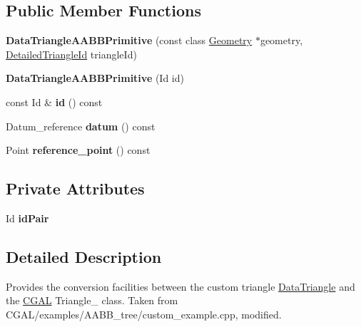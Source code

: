 \subsection*{Public Member Functions}
\begin{DoxyCompactItemize}
\item 
\mbox{\label{structpepr3d_1_1_data_triangle_a_a_b_b_primitive_ac15769289a1f00edca2755ef957c32ce}} 
{\bfseries Data\+Triangle\+A\+A\+B\+B\+Primitive} (const class \mbox{\hyperlink{classpepr3d_1_1_geometry}{Geometry}} $\ast$geometry, \mbox{\hyperlink{structpepr3d_1_1_detailed_triangle_id}{Detailed\+Triangle\+Id}} triangle\+Id)
\item 
\mbox{\label{structpepr3d_1_1_data_triangle_a_a_b_b_primitive_a1859d36669fbe329932f428f3ecee85f}} 
{\bfseries Data\+Triangle\+A\+A\+B\+B\+Primitive} (Id id)
\item 
\mbox{\label{structpepr3d_1_1_data_triangle_a_a_b_b_primitive_a8a808ea38f341eea53d9ee7b8ec75a5e}} 
const Id \& {\bfseries id} () const
\item 
\mbox{\label{structpepr3d_1_1_data_triangle_a_a_b_b_primitive_adc3319330dc4c5cbaa4c5fa04e6da337}} 
Datum\+\_\+reference {\bfseries datum} () const
\item 
\mbox{\label{structpepr3d_1_1_data_triangle_a_a_b_b_primitive_a2ea734c391b726dd56db7c8933f7dd0e}} 
Point {\bfseries reference\+\_\+point} () const
\end{DoxyCompactItemize}
\subsection*{Private Attributes}
\begin{DoxyCompactItemize}
\item 
\mbox{\label{structpepr3d_1_1_data_triangle_a_a_b_b_primitive_a6de025ee40eb24d625f08d227e575aa7}} 
Id {\bfseries id\+Pair}
\end{DoxyCompactItemize}


\subsection{Detailed Description}
Provides the conversion facilities between the custom triangle \mbox{\hyperlink{classpepr3d_1_1_data_triangle}{Data\+Triangle}} and the \mbox{\hyperlink{namespace_c_g_a_l}{C\+G\+AL}} Triangle\+\_ class. Taken from C\+G\+A\+L/examples/\+A\+A\+B\+B\+\_\+tree/custom\+\_\+example.\+cpp, modified. 

